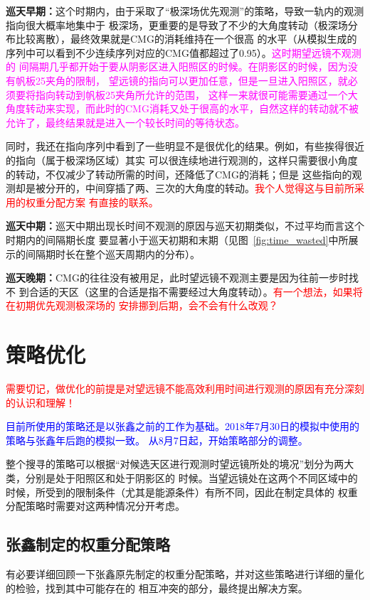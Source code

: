 \documentclass[a4paper,11pt]{ctexart}
\newcommand{\RT}[1]{\textcolor{red}{#1}}
\newcommand{\BT}[1]{\textcolor{blue}{#1}}
\newcommand{\MT}[1]{\textcolor{magenta}{#1}}
\begin{document}
\textbf{巡天早期：}这个时期内，由于采取了“极深场优先观测”的策略，导致一轨内的观测指向很大概率地集中于
极深场，更重要的是导致了不少的大角度转动（极深场分布比较离散），最终效果就是CMG的消耗维持在一个很高
的水平（从模拟生成的序列中可以看到不少连续序列对应的CMG值都超过了0.95）。\MT{这时期望远镜不观测的
间隔期几乎都开始于要从阴影区进入阳照区的时候。在阴影区的时候，因为没有帆板25\textdegree 夹角的限制，
望远镜的指向可以更加任意，但是一旦进入阳照区，就必须要将指向转动到帆板25\textdegree 夹角所允许的范围，
这样一来就很可能需要通过一个大角度转动来实现，而此时的CMG消耗又处于很高的水平，自然这样的转动就不被
允许了，最终结果就是进入一个较长时间的等待状态。}

同时，我还在指向序列中看到了一些明显不是很优化的结果。例如，有些挨得很近的指向（属于极深场区域）其实
可以很连续地进行观测的，这样只需要很小角度的转动，不仅减少了转动所需的时间，还降低了CMG的消耗；但是
这些指向的观测却是被分开的，中间穿插了两、三次的大角度的转动。\RT{我个人觉得这与目前所采用的权重分配方案
有直接的联系。}

\textbf{巡天中期：}巡天中期出现长时间不观测的原因与巡天初期类似，不过平均而言这个时期内的间隔期长度
要显著小于巡天初期和末期（见图~\ref{fig:time_wasted}中所展示的间隔期时长在整个巡天周期内的分布）。

\textbf{巡天晚期：}CMG的往往没有被用足，此时望远镜不观测主要是因为往前一步时找不
 到合适的天区（这里的合适是指不需要经过大角度转动）。\RT{有一个想法，如果将在初期优先观测极深场的
 安排挪到后期，会不会有什么改观？}



\newpage
\section{策略优化}

\RT{
需要切记，做优化的前提是对望远镜不能高效利用时间进行观测的原因有充分深刻的认识和理解！
}

\BT{目前所使用的策略还是以张鑫之前的工作为基础。2018年7月30日的模拟中使用的策略与张鑫年后跑的模拟一致。
从8月7日起，开始策略部分的调整。}

整个搜寻的策略可以根据“对候选天区进行观测时望远镜所处的境况”划分为两大类，分别是处于阳照区和处于阴影区的
时候。当望远镜处在这两个不同区域中的时候，所受到的限制条件（尤其是能源条件）有所不同，因此在制定具体的
权重分配策略时需要对这两种情况分开考虑。

\subsection{张鑫制定的权重分配策略}
有必要详细回顾一下张鑫原先制定的权重分配策略，并对这些策略进行详细的量化的检验，找到其中可能存在的
相互冲突的部分，最终提出解决方案。
\end{document}
